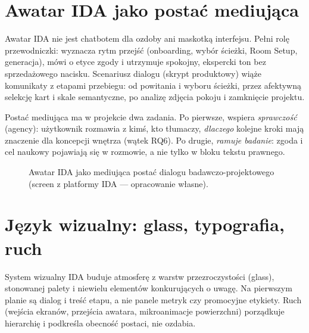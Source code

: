 \section{Awatar IDA jako postać mediująca}
\label{ch07:sec:awatar}

Awatar IDA nie jest chatbotem dla ozdoby ani maskotką interfejsu. Pełni rolę przewodniczki: wyznacza rytm przejść (onboarding, wybór ścieżki, Room Setup, generacja), mówi o etyce zgody i utrzymuje spokojny, ekspercki ton bez sprzedażowego nacisku.
Scenariusz dialogu (skrypt produktowy) wiąże komunikaty z etapami przebiegu: od powitania i wyboru ścieżki, przez afektywną selekcję kart i skale semantyczne, po analizę zdjęcia pokoju i zamknięcie projektu.

Postać mediująca ma w projekcie dwa zadania. Po pierwsze, wspiera \emph{sprawczość} (agency): użytkownik rozmawia z kimś, kto tłumaczy, \emph{dlaczego} kolejne kroki mają znaczenie dla koncepcji wnętrza (wątek RQ6). Po drugie, \emph{ramuje badanie}: zgoda i cel naukowy pojawiają się w rozmowie, a nie tylko w bloku tekstu prawnego.

\begin{figure}[htbp]
  \centering
  \caption{Awatar IDA jako mediująca postać dialogu badawczo-projektowego (screen z platformy IDA --- opracowanie własne).}
  \label{fig:ch07:avatar}
\end{figure}

\section{Język wizualny: glass, typografia, ruch}
\label{ch07:sec:ui}

System wizualny IDA buduje atmosferę z warstw przezroczystości (glass), stonowanej palety i niewielu elementów konkurujących o uwagę. Na pierwszym planie są dialog i treść etapu, a nie panele metryk czy promocyjne etykiety. Ruch (wejścia ekranów, przejścia awatara, mikroanimacje powierzchni) porządkuje hierarchię i podkreśla obecność postaci, nie ozdabia.

